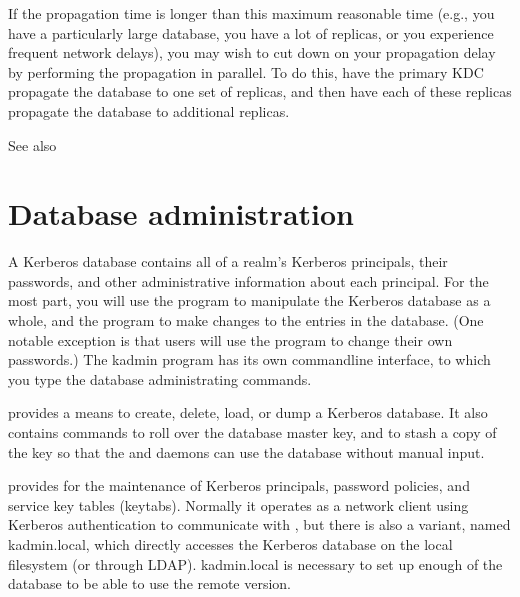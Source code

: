 \documentclass[letterpaper,10pt,english]{sphinxmanual}
\begin{document}
\sphinxAtStartPar
If the propagation time is longer than this maximum reasonable time
(e.g., you have a particularly large database, you have a lot of
replicas, or you experience frequent network delays), you may wish to
cut down on your propagation delay by performing the propagation in
parallel.  To do this, have the primary KDC propagate the database to
one set of replicas, and then have each of these replicas propagate
the database to additional replicas.

\sphinxAtStartPar
See also {\hyperref[\detokenize{admin/database:incr-db-prop}]{}}

\sphinxstepscope


\chapter{Database administration}
\label{\detokenize{admin/database:database-administration}}\label{\detokenize{admin/database::doc}}
\sphinxAtStartPar
A Kerberos database contains all of a realm’s Kerberos principals,
their passwords, and other administrative information about each
principal.  For the most part, you will use the {\hyperref[\detokenize{admin/admin_commands/kdb5_util:kdb5-util-8}]{}}
program to manipulate the Kerberos database as a whole, and the
{\hyperref[\detokenize{admin/admin_commands/kadmin_local:kadmin-1}]{}} program to make changes to the entries in the
database.  (One notable exception is that users will use the
 program to change their own passwords.)  The kadmin
program has its own command\sphinxhyphen{}line interface, to which you type the
database administrating commands.

\sphinxAtStartPar
{\hyperref[\detokenize{admin/admin_commands/kdb5_util:kdb5-util-8}]{}} provides a means to create, delete, load, or dump
a Kerberos database.  It also contains commands to roll over the
database master key, and to stash a copy of the key so that the
{\hyperref[\detokenize{admin/admin_commands/kadmind:kadmind-8}]{}} and {\hyperref[\detokenize{admin/admin_commands/krb5kdc:krb5kdc-8}]{}} daemons can use the database
without manual input.

\sphinxAtStartPar
{\hyperref[\detokenize{admin/admin_commands/kadmin_local:kadmin-1}]{}} provides for the maintenance of Kerberos principals,
password policies, and service key tables (keytabs).  Normally it
operates as a network client using Kerberos authentication to
communicate with {\hyperref[\detokenize{admin/admin_commands/kadmind:kadmind-8}]{}}, but there is also a variant, named
kadmin.local, which directly accesses the Kerberos database on the
local filesystem (or through LDAP).  kadmin.local is necessary to set
up enough of the database to be able to use the remote version.
\end{document}
